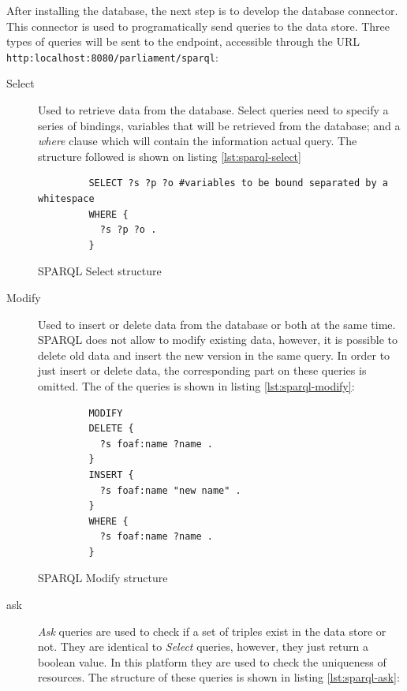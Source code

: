 After installing the database, the next step is to develop the database connector. This connector is used to programatically send queries to the data store. Three types of queries will be sent to the endpoint, accessible through the URL \texttt{http:localhost:8080/parliament/sparql}:

\begin{description}
\item[Select] Used to retrieve data from the database. Select queries need to specify a series of bindings, variables that will be retrieved from the database; and a \textit{where} clause which will contain the information actual query. The structure followed is shown on listing \ref{lst:sparql-select}

\begin{listing}[ht]\centering
  \begin{minipage}{.6\textwidth}
    \begin{verbatim}
	     SELECT ?s ?p ?o #variables to be bound separated by a whitespace
	     WHERE {
	       ?s ?p ?o . 
	     }
    \end{verbatim}
  \end{minipage}
  \caption{SPARQL Select structure}\label{lst:sparql-select}
\end{listing}

\item[Modify] Used to insert or delete data from the database or both at the same time. SPARQL does not allow to modify existing data, however, it is possible to delete old data and insert the new version in the same query. In order to just insert or delete data, the corresponding part on these queries is omitted. The of the queries is shown in listing \ref{lst:sparql-modify}:

\begin{listing}[ht]\centering
  \begin{minipage}{.6\textwidth}
    \begin{verbatim}
	     MODIFY
	     DELETE {
	       ?s foaf:name ?name . 
	     }
	     INSERT {
	       ?s foaf:name "new name" . 
	     }
	     WHERE {
	       ?s foaf:name ?name . 
	     }
    \end{verbatim}
  \end{minipage}
  \caption{SPARQL Modify structure}\label{lst:sparql-modify}
\end{listing}
 
\item[ask] \textit{Ask} queries are used to check if a set of triples exist in the data store or not. They are identical to \textit{Select} queries, however, they just return a boolean value. In this platform they are used to check the uniqueness of resources. The structure of these queries is shown in listing \ref{lst:sparql-ask}:


\end{description}
